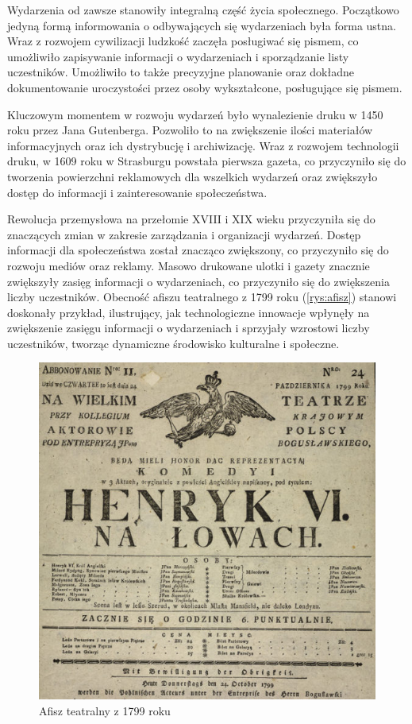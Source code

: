Wydarzenia od zawsze stanowiły integralną część życia społecznego. Początkowo jedyną formą informowania o odbywających się wydarzeniach była forma  ustna. Wraz z rozwojem cywilizacji ludzkość zaczęła posługiwać się pismem, co umożliwiło zapisywanie informacji o wydarzeniach i sporządzanie listy uczestników. Umożliwiło to także precyzyjne planowanie oraz dokładne dokumentowanie uroczystości przez osoby wykształcone, posługujące się pismem.

Kluczowym momentem w rozwoju wydarzeń było wynalezienie druku w 1450 roku przez Jana Gutenberga. Pozwoliło to na zwiększenie ilości materiałów informacyjnych oraz ich dystrybucję i archiwizację. Wraz z rozwojem technologii druku, w 1609 roku w Strasburgu powstała pierwsza gazeta, co przyczyniło się do tworzenia powierzchni reklamowych dla wszelkich wydarzeń oraz zwiększyło dostęp do informacji i zainteresowanie społeczeństwa. \autocite{gazeta}

Rewolucja przemysłowa na przełomie XVIII i XIX wieku przyczyniła się do znaczących zmian w zakresie zarządzania i organizacji wydarzeń. Dostęp informacji dla społeczeństwa został znacząco zwiększony, co przyczyniło się do rozwoju mediów oraz reklamy. Masowo drukowane ulotki i gazety znacznie zwiększyły zasięg informacji o wydarzeniach, co przyczyniło się do zwiększenia liczby uczestników. Obecność afiszu teatralnego z 1799 roku (\autoref{rys:afisz}) stanowi doskonały przykład, ilustrujący, jak technologiczne innowacje wpłynęły na zwiększenie zasięgu informacji o wydarzeniach i sprzyjały wzrostowi liczby uczestników, tworząc dynamiczne środowisko kulturalne i społeczne.

\begin{figure} [H]
    \begin{center}
    \includegraphics[scale=0.20]{imgs/afisz.jpg}
    \end{center}
    \caption{Afisz teatralny z 1799 roku \autocite{polona}}
    \label{rys:afisz}
    \end{figure}

